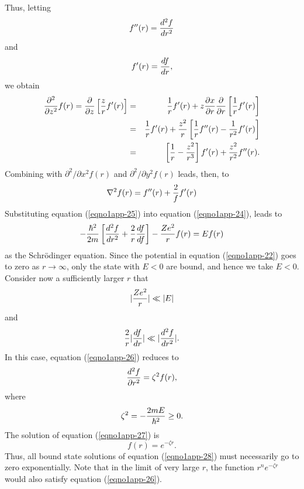 Thus, letting
\begin{equation}
f^{\prime \prime} ( r ) = {d^2 f \over dr^2}
\end{equation}
and
\begin{equation}
f^\prime( r ) = {d f \over dr} ,
\end{equation}
we obtain
\begin{eqnarray}
{\partial^2 \over \partial z^2} f(r) = {\partial \over \partial z} 
\left[ {z \over r} f^{\prime} (r) \right] &=& {1 \over r} f^{\prime} 
(r) + z {\partial x \over \partial r} {\partial \over \partial r} 
\left[ {1 \over r} f^{\prime} (r) \right]\cr
&=& {1 \over r} f^{\prime} (r) + {z^2 \over r} \left[ {1 \over r} 
f^{\prime \prime} (r) - {1 \over r^2} f^{\prime} (r) \right]\cr
&=& \left[ {1 \over r} - {z^2 \over r^3} \right] 
f^{\prime} (r) + {z^2 \over r^2} f^{\prime \prime} (r).
\end{eqnarray}
Combining with $\partial^2 / \partial x^2 f(r)$ and $\partial^2 / 
\partial y^2f(r)$ leads, then, to
\begin{equation}
\nabla^2 f ( r ) = f^{\prime \prime} (r) + {2 \over f} f^{\prime}(r)
\label{eqno1app-25}
\end{equation}
Substituting equation (\ref{eqno1app-25}) into equation
(\ref{eqno1app-24}), leads to
\begin{equation}
- {\hbar^2 \over 2m} \left[ {d^2f \over dr^2} + {2 \over r} {df \over 
df} \right] - {Ze^2 \over r} f ( r ) = E f (r)
\label{eqno1app-26}
\end{equation}
as the Schr\"odinger equation.  Since the potential in equation
(\ref{eqno1app-22}) goes to zero as $r \rightarrow \infty$, only the
state with $E < 0$ are bound, and hence we take $E < 0$.  Consider now
a sufficiently larger $r$ that
\begin{equation}
\vert {Ze^2 \over r} \vert \ll \vert E \vert
\end{equation}
and
\begin{equation}
{2 \over r} \vert {df \over dr} \vert \ll \vert {d^2f \over dr^2} \vert .
\end{equation}
In this case, equation (\ref{eqno1app-26}) reduces to
\begin{equation}
{d^2 f \over \partial r^2} = \zeta^2 f(r),
\label{eqno1app-27}
\end{equation}
where
\begin{equation}
\zeta^2 = - {2mE \over \hbar^2} \geq 0.
\label{eqno1app-28}
\end{equation}
The solution of equation (\ref{eqno1app-27}) is
\begin{equation}
f(r) = e^{- \zeta r} .
\label{eqno1app-29}
\end{equation}
Thus, all bound state solutions of equation (\ref{eqno1app-28}) must
necessarily go to zero exponentially. Note that in the limit of very
large $r$, the function $r^n e^{-\zeta r}$ would also satisfy equation
(\ref{eqno1app-26}).

